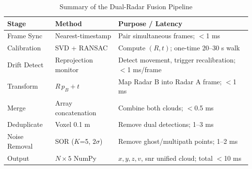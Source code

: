 \begin{table}[H]
\caption{Summary of the Dual-Radar Fusion Pipeline}
\label{tab:summary_3}
\centering
\begin{tabularx}{\textwidth}{@{} l X X @{}}
\toprule
\textbf{Stage} & \textbf{Method} & \textbf{Purpose / Latency} \\ \midrule
Frame Sync & Nearest-timestamp & Pair simultaneous frames; $<$1 ms \\
Calibration & SVD + RANSAC & Compute $(R, t)$; one-time 20--30 s walk \\
Drift Detect & Reprojection monitor & Detect movement, trigger recalibration; $<$1 ms/frame \\
Transform & $R\,p_B+t$ & Map Radar B into Radar A frame; $<$1 ms \\
Merge & Array concatenation & Combine both clouds; $<$0.5 ms \\
Deduplicate & Voxel 0.1 m & Remove dual detections; 1--3 ms \\
Noise Removal & SOR ($K$=5, $2\sigma$) & Remove ghost/multipath points; 1--2 ms \\
Output & $N \times 5$ NumPy & $x, y, z, v$, snr unified cloud; total $<$10 ms \\ \bottomrule
\end{tabularx}
\end{table}

